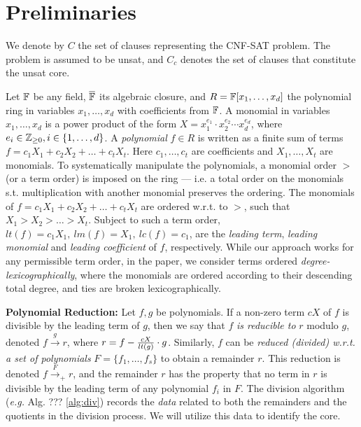 \section{Preliminaries}

We denote by $C$ the set of clauses representing the CNF-SAT
problem. The problem is assumed to be unsat, and $C_c$ denotes
the set of clauses that constitute the unsat core. 

Let ${\mathbb{F}}$ be any field, $\overline{\mathbb{F}}$ its algebraic closure, and $R = {\mathbb{F}[x_1,\dots,x_d]}$ 
the polynomial ring in variables $x_1, \dots, x_d$ with coefficients
from ${\mathbb{F}}$. A monomial in
variables $x_1, \dots, x_d$  is a power product of the form  $X =
x_1^{e_{1}}\cdot x_2^{e_{2}}\cdots x_d^{e_{d}}$, where 
$e_i \in {\mathbb{Z}}_{\geq 0}, i\in \{1, \dots, d\}$. A {\it polynomial} 
$f \in R$ is written as a finite sum of terms 
$f = c_1 X_1 + c_2 X_2 + \dots + c_t X_t$.  Here $c_1, \dots, c_t$ are
coefficients and $X_1, \dots, X_t$ are monomials. To systematically
manipulate the polynomials, a monomial order $>$ (or a term order) is
imposed on the ring --- i.e. a total order on the monomials
s.t. multiplication with another monomial preserves the ordering.
The monomials of $f = c_1 X_1 + c_2 X_2 + \dots + c_t X_t$  are
ordered w.r.t. to $>$, such that  $X_1 > X_2 > \dots >  X_t$.  Subject
to such a term order, $lt(f) = c_1 X_1, ~lm(f) = X_1, ~lc(f) = c_1$,
are the {\it leading term}, {\it leading monomial} and {\it   leading
  coefficient} of $f$, respectively. 
While our approach works for any permissible term order, in the paper,
we consider terms ordered {\it degree-lexicographically}, where the
monomials are ordered according to their descending total degree, and
ties are broken lexicographically.  

{\bf Polynomial Reduction:} Let $f, g$ be polynomials. If a non-zero
term $cX$ of $f$ is divisible by the leading term of $g$, then we say
that $f$ {\it is reducible to} $r$ modulo $g$, denoted $f
\stackrel{g}{\textstyle\longrightarrow} r$, where $r = f - {cX   \over
  lt(g)} \cdot g$. Similarly, $f$ can be {\it reduced (divided) 
w.r.t. a set of polynomials}  $F = \{f_1, \dots, f_s\}$ to obtain a
remainder $r$. This reduction is denoted $f \stackrel{F} {\textstyle
  \longrightarrow}_+ r$, and the remainder $r$ has the property that
no term in $r$ is divisible by the leading term of any polynomial
$f_i$ in $F$. The division algorithm ({\it e.g.} Alg. ??? \ref{alg:div})
records the {\it data} related to both the remainders and the quotients in
the division process. We will utilize this data to identify the core. 

